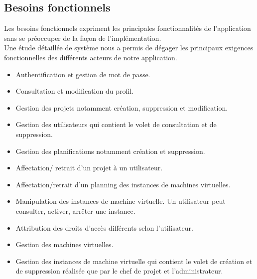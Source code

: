 \subsection{Besoins fonctionnels}
Les besoins fonctionnels expriment les principales fonctionnalités de l'application sans se
préoccuper de la façon de l'implémentation.\\
Une étude détaillée de système nous a permis de dégager les principaux exigences fonctionnelles
des différents acteurs de notre application.
\begin{itemize}
	\item Authentification et gestion de mot de passe.
	\item Consultation et modification du profil.
	\item Gestion des projets notamment création, suppression et modification.
	\item Gestion des utilisateurs qui contient le volet de consultation et de suppression.
		\item Gestion des planifications notamment création et suppression.
	\item Affectation/ retrait d'un projet à un utilisateur.
	\item Affectation/retrait d'un planning des instances de machines virtuelles.
	\item Manipulation des instances de machine virtuelle. Un utilisateur peut consulter, activer, arrêter 
	une instance.
	\item Attribution des droits d'accès différents selon l'utilisateur.
	\item Gestion des machines virtuelles.
	\item Gestion des instances de machine virtuelle qui contient le volet de création et de suppression réalisée que par le chef de projet et l'administrateur.
\end{itemize}



